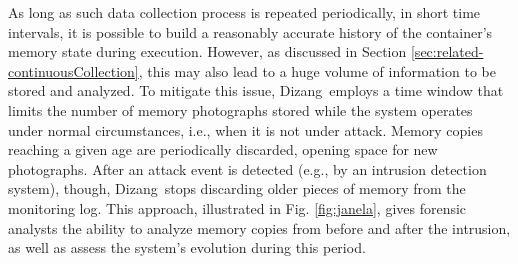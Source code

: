 \documentclass[10pt,journal,compsoc]{IEEEtran}
\newcommand{\fancyname}{Dizang}
\begin{document}
As long as such data collection process is repeated periodically, in short time intervals, it is possible to build a reasonably accurate history of the container's memory state during execution.
%
However, as discussed in Section \ref{sec:related-continuousCollection}, this may also lead to a huge volume of information to be stored and analyzed.
%
%
%
To mitigate this issue, \fancyname\ employs a time window that limits the number of memory photographs stored while the system operates under normal circumstances, i.e., when it is not under attack.
%
Memory copies reaching a given age are periodically discarded, opening space for new photographs.
%
After an attack event is detected (e.g., by an intrusion detection system), though, \fancyname\ stops discarding older pieces of memory from the monitoring log.
%
This approach, illustrated in Fig. \ref{fig:janela}, gives forensic analysts the ability to analyze memory copies from before and after the intrusion, as well as assess the system's evolution during this period.


%
%
\end{document}
